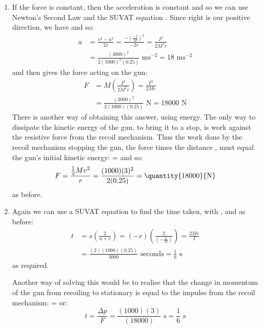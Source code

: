 \begin{problem}[A1972AMIIQ2l]
{\begin{enumerate}
Impulse is measured in  (kilogram metres per second) or  (Newton seconds), where the former is expressed in SI base units but the two are completely equivalent (this can be shown by substituting in the definition  $\equiv$ ). Energy is measured in  (Joules) or  (kilogram meters squared per second squared), again equivalent units.
	\item If the force is constant, then the acceleration is constant and so we can use Newton's Second Law and the SUVAT equation . Since right is our positive direction, we have   and  so:
\begin{align*} 
a &= \frac{v^{2} - u^{2}}{2s} = \frac{-\left( \frac{-I}{M} \right)^{2}}{-2r} = \frac{I^{2}}{2M^{2}r} \\ 
&= \frac{(3000)^{2}}{2(1000)^{2}(0.25)} \text{ ms}^{-2} = 18 \text{ ms}^{-2} 
\end{align*}
and then  gives the force acting on the gun:
\begin{align*} 
F &= M \left( \frac{I^{2}}{2M^{2}r} \right) = \frac{I^{2}}{2Mr} \\ 
&= \frac{(3000)^{2}}{2(1000)(0.25)} \text{ N} = 18000 \text{ N} 
\end{align*}
There is another way of obtaining this answer, using energy. The only way to dissipate the kinetic energy of the gun, to bring it to a stop, is work against the resistive force from the recoil mechanism. Thus the work done by the recoil mechanism stopping the gun, the force times the distance , must equal the gun's initial kinetic energy:  =  and so:
\begin{equation*} 
F = \frac{\frac{1}{2}Mv^{2}}{r} = \frac{(1000)(3)^{2}}{2(0.25)} = \mbox{\quantity{18000}{N}} 
\end{equation*} as before.

	\item Again we can use a SUVAT equation to find the time taken,  with ,  and  as before:
\begin{align*} 
t &= s \left( \frac{2}{u + v} \right) = (-r) \left( \frac{2}{\left( -\frac{I}{M} \right)} \right) = \frac{2Mr}{I} \\ 
&= \frac{(2)(1000)(0.25)}{3000} \text{ seconds} = \frac{1}{6} \text{ s} 
\end{align*} as required.

Another way of solving this would be to realise that the change in momentum of the gun from recoiling to stationary is equal to the impulse from the recoil mechanism:  =  or:
\begin{equation*} 
t = \frac{\Delta p}{F} = \frac{(1000)(3)}{(18000)} \text{ s} = \frac{1}{6} \text{ s}
 \end{equation*}

\end{enumerate}}
\end{problem}
